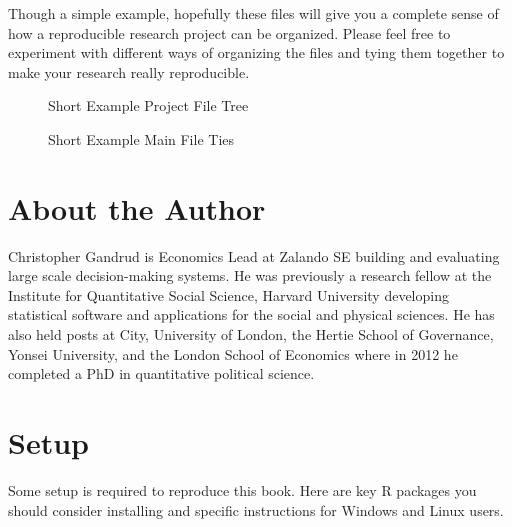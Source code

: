 \documentclass[]{krantz}
\theoremstyle{definition}
\theoremstyle{definition}
\theoremstyle{definition}
\theoremstyle{remark}
\begin{document}
Though a simple example, hopefully these files will give you a complete
sense of how a reproducible research project can be organized. Please
feel free to experiment with different ways of organizing the files and
tying them together to make your research really reproducible.

\thispagestyle{plain}
    \begin{figure}[th!]
        \caption{Short Example Project File Tree}
        \label{ExampProjeFiles}
        \begin{center}
            
        \end{center}
    \end{figure}

\clearpage
\thispagestyle{plain}
\begin{landscape}
    \begin{figure}[th!]
        \caption{Short Example Main File Ties}
        \label{ExampProjDiagram}
        \begin{center}
            
        \end{center}
    \end{figure}
\end{landscape}

\hypertarget{about-the-author}{%
\chapter*{About the Author}\label{about-the-author}}


Christopher Gandrud is Economics Lead at Zalando SE building and
evaluating large scale decision-making systems. He was previously a
research fellow at the Institute for Quantitative Social Science,
Harvard University developing statistical software and applications for
the social and physical sciences. He has also held posts at City,
University of London, the Hertie School of Governance, Yonsei
University, and the London School of Economics where in 2012 he
completed a PhD in quantitative political science.

\hypertarget{setup}{%
\chapter*{Setup}\label{setup}}


Some setup is required to reproduce this book. Here are key R packages
you should consider installing and specific instructions for Windows and
Linux users.
\end{document}
